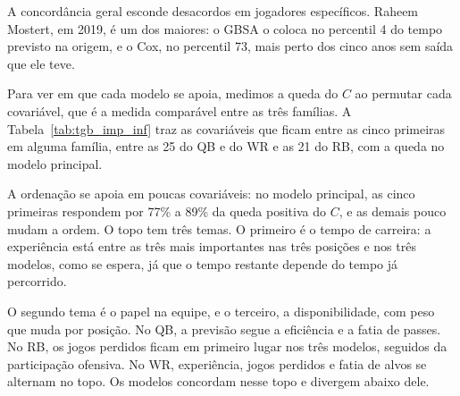 A concordância geral esconde desacordos em jogadores específicos. Raheem Mostert, em 2019, é um dos maiores: o GBSA o coloca no percentil 4 do tempo previsto na origem, e o Cox, no percentil 73, mais perto dos cinco anos sem saída que ele teve.

Para ver em que cada modelo se apoia, medimos a queda do $C$ ao permutar cada covariável, que é a medida comparável entre as três famílias. A Tabela~\ref{tab:tgb_imp_inf} traz as covariáveis que ficam entre as cinco primeiras em alguma família, entre as 25 do QB e do WR e as 21 do RB, com a queda no modelo principal.

A ordenação se apoia em poucas covariáveis: no modelo principal, as cinco primeiras respondem por 77\% a 89\% da queda positiva do $C$, e as demais pouco mudam a ordem. O topo tem três temas. O primeiro é o tempo de carreira: a experiência está entre as três mais importantes nas três posições e nos três modelos, como se espera, já que o tempo restante depende do tempo já percorrido.

O segundo tema é o papel na equipe, e o terceiro, a disponibilidade, com peso que muda por posição. No QB, a previsão segue a eficiência e a fatia de passes. No RB, os jogos perdidos ficam em primeiro lugar nos três modelos, seguidos da participação ofensiva. No WR, experiência, jogos perdidos e fatia de alvos se alternam no topo. Os modelos concordam nesse topo e divergem abaixo dele.


